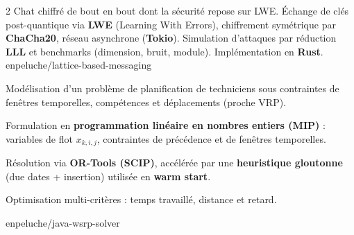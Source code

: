 \documentclass[10pt,a4paper,ragged2e,withhyper]{cv}
\newcommand{\kw}[1]{\textbf{\color{name}#1}}
\begin{document}
\begin{paracol}{2}
  {Chat chiffré de bout en bout dont la sécurité repose sur LWE.
    Échange de clés post-quantique via \kw{LWE} (Learning With Errors),
    chiffrement symétrique par \kw{ChaCha20}, réseau asynchrone (\kw{Tokio}).
    Simulation d'attaques par réduction \kw{LLL} et benchmarks (dimension, bruit, module).
    Implémentation en \kw{Rust}.}
  {enpeluche/lattice-based-messaging}


  \vspace*{\fill} %

  {Modélisation d’un problème de planification de techniciens sous contraintes de
    fenêtres temporelles, compétences et déplacements (proche VRP).

    Formulation en \kw{programmation linéaire en nombres entiers (MIP)} :
    variables de flot $x_{k,i,j}$, contraintes de précédence et de fenêtres temporelles.

    Résolution via \kw{OR-Tools (SCIP)}, accélérée par une \kw{heuristique gloutonne}
    (due dates + insertion) utilisée en \kw{warm start}.

    Optimisation multi-critères : temps travaillé, distance et retard.}
  {enpeluche/java-wsrp-solver}

\end{paracol}
\end{document}
